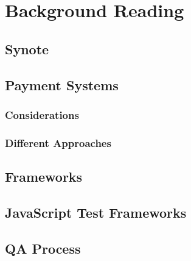 \chapter{Background Reading}
\label{chap:background-reading}

\section{Synote}
\label{sec:synote}

\section{Payment Systems}
\label{sec:payment-systems}

\subsection{Considerations}
\label{subsec:considerations}

\subsection{Different Approaches}
\label{subsec:different-approaches}

\section{Frameworks}
\label{sec:frameworks}

\section{JavaScript Test Frameworks}
\label{sec:frameworks}

\section{QA Process}
\label{sec:qa-process}